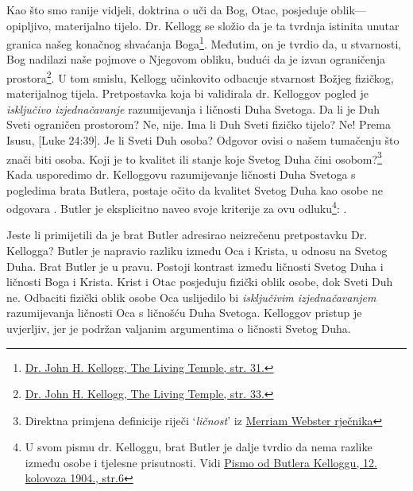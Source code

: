 Kao što smo ranije vidjeli, doktrina o  uči da Bog, Otac, posjeduje oblik—opipljivo, materijalno tijelo. Dr. Kellogg se složio da je ta tvrdnja istinita unutar granica našeg konačnog shvaćanja Boga\footnote{\href{https://archive.org/details/J.H.Kellogg.TheLivingTemple1903/page/n33/}{Dr. John H. Kellogg, The Living Temple, str. 31.}}. Međutim, on je tvrdio da, u stvarnosti, Bog nadilazi naše pojmove o Njegovom obliku, budući da je izvan ograničenja prostora\footnote{\href{https://archive.org/details/J.H.Kellogg.TheLivingTemple1903/page/n33/}{Dr. John H. Kellogg, The Living Temple, str. 33.}}. U tom smislu, Kellogg učinkovito odbacuje stvarnost Božjeg fizičkog, materijalnog tijela. Pretpostavka koja bi validirala dr. Kelloggov pogled je \textit{isključivo izjednačavanje} razumijevanja  i ličnosti Duha Svetoga. Da li je Duh Sveti ograničen prostorom? Ne, nije. Ima li Duh Sveti fizičko tijelo? Ne! Prema Isusu, [Luke 24:39]. Je li Sveti Duh osoba? Odgovor ovisi o našem tumačenju što znači biti osoba. Koji je to kvalitet ili stanje koje Svetog Duha čini osobom?\footnote{Direktna primjena definicije riječi ‘\textit{ličnost}’ iz \href{https://www.merriam-webster.com/dictionary/personality}{Merriam Webster rječnika}} Kada usporedimo dr. Kelloggovu razumijevanje ličnosti Duha Svetoga s pogledima brata Butlera, postaje očito da kvalitet Svetog Duha kao osobe ne odgovara . Butler je eksplicitno naveo svoje kriterije za ovu odluku\footnote{U svom pismu dr. Kelloggu, brat Butler je dalje tvrdio da nema razlike između osobe i tjelesne prisutnosti. Vidi \href{https://c7da.us/egwdl/Butler\%20to\%20Kellogg\%20Aug121904.pdf}{Pismo od Butlera Kelloggu, 12. kolovoza 1904., str.6}}: .

Jeste li primijetili da je brat Butler adresirao neizrečenu pretpostavku Dr. Kellogga? Butler je napravio razliku između Oca i Krista, u odnosu na Svetog Duha. Brat Butler je u pravu. Postoji kontrast između ličnosti Svetog Duha i ličnosti Boga i Krista. Krist i Otac posjeduju fizički oblik osobe, dok Sveti Duh ne. Odbaciti fizički oblik osobe Oca uslijedilo bi \textit{isključivim izjednačavanjem} razumijevanja ličnosti Oca s ličnošću Duha Svetoga. Kelloggov pristup je uvjerljiv, jer je podržan valjanim argumentima o ličnosti Svetog Duha.

